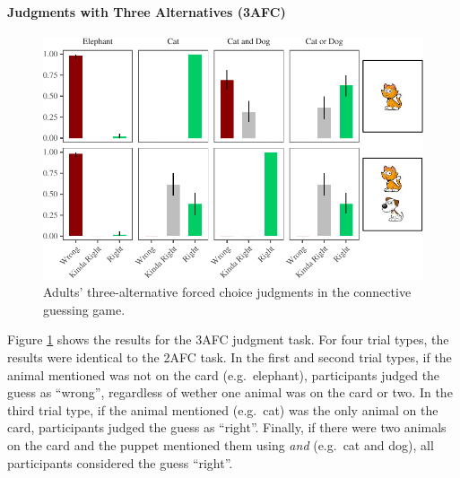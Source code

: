 \documentclass[floatsintext,man]{apa6}
\theoremstyle{definition}
\theoremstyle{definition}
\theoremstyle{definition}
\theoremstyle{remark}
\begin{document}
\paragraph{Judgments with Three Alternatives
(3AFC)}\label{judgments-with-three-alternatives-3afc}

\begin{figure}
\centering
\includegraphics{figs/ternaryAdultsPlot-1.pdf}
\caption{\label{fig:ternaryAdultsPlot}Adults' three-alternative forced
choice judgments in the connective guessing game.}
\end{figure}

Figure \ref{fig:ternaryAdultsPlot} shows the results for the 3AFC
judgment task. For four trial types, the results were identical to the
2AFC task. In the first and second trial types, if the animal mentioned
was not on the card (e.g.~elephant), participants judged the guess as
\enquote{wrong}, regardless of wether one animal was on the card or two.
In the third trial type, if the animal mentioned (e.g.~cat) was the only
animal on the card, participants judged the guess as \enquote{right}.
Finally, if there were two animals on the card and the puppet mentioned
them using \emph{and} (e.g.~cat and dog), all participants considered
the guess \enquote{right}.
\end{document}
